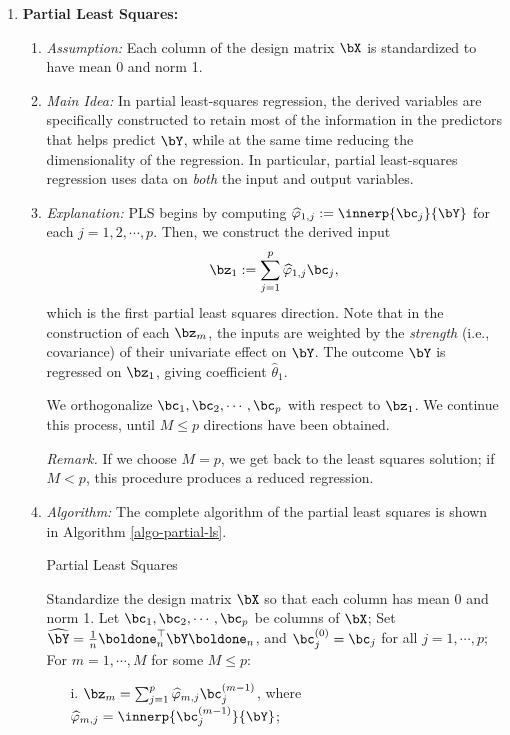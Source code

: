 \documentclass[12pt]{article}
\begin{document}
\begin{enumerate}[label=\textbf{\arabic*.}]
	\item \textbf{Partial Least Squares:} 
	\begin{enumerate}
		\item \textit{Assumption:} Each column of the design matrix $\bX$ is standardized to have mean 0 and norm 1. 
		
		\item \textit{Main Idea:} In partial least-squares regression, the derived variables are specifically constructed to retain most of the information in the predictors that helps predict $\bY$, while at the same time reducing the dimensionality of the regression. In particular, partial least-squares regression uses data on \emph{both} the input and output variables. 
		
		\item \textit{Explanation:} PLS begins by computing $\widehat{\varphi}_{1, j} := \innerp{\bc_j}{\bY}$ for each $j = 1, 2, \cdots, p$. Then, we construct the derived input 
		\begin{align*}
			\bz_1 := \sum_{j=1}^p \widehat{\varphi}_{1, j} \bc_j, 
		\end{align*}
		which is the first partial least squares direction. Note that in the construction of each $\bz_m$, the inputs are weighted by the \emph{strength} (i.e., covariance) of their univariate effect on $\bY$. The outcome $\bY$ is regressed on $\bz_1$, giving coefficient $\hat{\theta}_1$. 
		
		We orthogonalize $\bc_1, \bc_2, \cdots, \bc_p$ with respect to $\bz_1$. We continue this process, until $M \le p$ directions have been obtained. 
		
		\textit{Remark.} If we choose $M = p$, we get back to the least squares solution; if $M < p$, this procedure produces a reduced regression. 
		
		\item \textit{Algorithm:} The complete algorithm of the partial least squares is shown in Algorithm \ref{algo-partial-ls}. 
		
		\begin{minipage}{\linewidth}
		\begin{algorithm}[H]
			\caption{Partial Least Squares}\label{algo-partial-ls}
			\begin{algorithmic}[1]
			\STATE Standardize the design matrix $\bX$ so that each column has mean 0 and norm 1. Let $\bc_1, \bc_2, \cdots, \bc_p$ be columns of $\bX$; 
			\vspace{5pt}
			\STATE Set $\widehat{\bY} = \frac{1}{n} \boldone_n^\top \bY \boldone_n$, and $\bc_j^{(0)} = \bc_j$ for all $j = 1, \cdots, p$; 
			\vspace{5pt}
			\STATE For $m = 1, \cdots, M$ for some $M \le p$: 
			\vspace{5pt}
			\begin{enumerate}
				\item[i.] $\bz_m = \sum_{j=1}^p \widehat{\varphi}_{m, j} \bc_j^{(m-1)}$, where $\widehat{\varphi}_{m,j} = \innerp{\bc_j^{(m-1)}}{\bY}$; 
				

\end{enumerate}
\end{algorithmic}
\end{algorithm}
\end{minipage}
\end{enumerate}
\end{enumerate}
\end{document}
